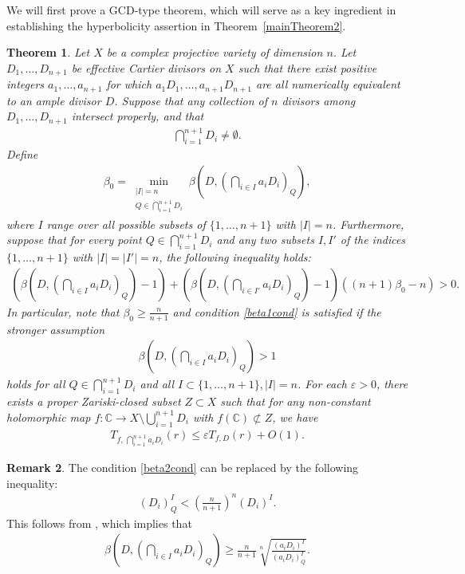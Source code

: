 \documentclass[10pt]{amsart}
\numberwithin{equation}{section}
\theoremstyle{plain}
\newtheorem{theorem}{Theorem}[section]
\theoremstyle{definition}
\newtheorem{remark}[theorem]{Remark}
\begin{document}
We will first prove a GCD-type theorem, which will serve as a key ingredient in establishing the hyperbolicity assertion in Theorem~\ref{mainTheorem2}.

\begin{theorem}\label{complexgcd2}
Let $X$ be a complex projective variety  of dimension $n$. 
Let $D_1, \ldots,D_{n+1}$ be effective Cartier  divisors on $X$ such that  there exist positive integers $a_1,\ldots, a_{n+1}$ for which $a_1D_1, \ldots, a_{n+1}D_{n+1}$ are all numerically equivalent to an ample divisor $D$.  
Suppose that  any collection of $n$ divisors among  $D_1, \ldots,D_{n+1}$ intersect properly, and that 
\begin{align*}
\bigcap_{i=1}^{n+1}D_i\neq \emptyset.
\end{align*}
Define
\begin{align*}
\beta_0=\min_{\substack{|I|=n\\Q\in \bigcap_{i=1}^{n+1}D_i }} \beta(D,(\bigcap_{i \in I} a_iD_i)_Q),
\end{align*}
where $I$ range over all possible subsets of $\{1,\ldots,n+1\}$ with $|I|=n$.
Furthermore, suppose that for every point $Q\in \bigcap_{i=1}^{n+1}D_i$ and any two subsets $I,I'$ of the indices $\{1,\ldots,n+1\}$ with $|I|=|I'|=n$,  the following inequality holds:
\begin{align}
\label{beta1cond}
(\beta(D,(\bigcap_{i \in I}a_iD_i)_Q)-1)+(\beta(D,(\bigcap_{i \in I'}a_iD_i)_Q)-1)((n+1)\beta_0-n)>0. 
\end{align}
In particular,  note that 
 $\beta_0\geq \frac{n}{n+1}$ and condition \eqref{beta1cond} is satisfied if the stronger assumption
\begin{align}
\label{beta2cond}
\beta(D,(\bigcap_{i \in I}a_iD_i)_Q)>1
\end{align}
holds for all $Q\in  \bigcap_{i=1}^{n+1}D_i  $ and all $I \subset \{1,\ldots,n+1\}, |I|=n$.  
For each $\varepsilon>0$,   there exists a proper Zariski-closed subset $Z\subset X$ such that for any non-constant holomorphic map $f:\mathbb{C}\to X\setminus{\bigcup_{i=1}^{n+1} } D_i$ with $f(\mathbb{C})\not\subset Z$,  we have 
\begin{align*}
T_{f, \,\bigcap_{i=1}^{n+1}a_iD_i}(r) 
        \le \varepsilon  T_{f,D}(r)+O(1). 
\end{align*}
\end{theorem}
 \begin{remark}
The condition \eqref{beta2cond} can be replaced by  the following inequality:
\begin{align}
\label{49ineq2}
(D_i)^I_Q<\left(\frac{n}{n+1}\right)^n(D_i)^I.
\end{align}
This follows from \cite[Lemma~3.11]{HLX}, which implies that
    \begin{align*}
        \beta(D,(\bigcap_{i \in I}a_iD_i)_Q) %
         \geq \frac{n}{n+1} \sqrt[n]{\frac{(a_iD_i)^I}{(a_iD_i)^I_Q}}.
    \end{align*}
 \end{remark}
\end{document}
